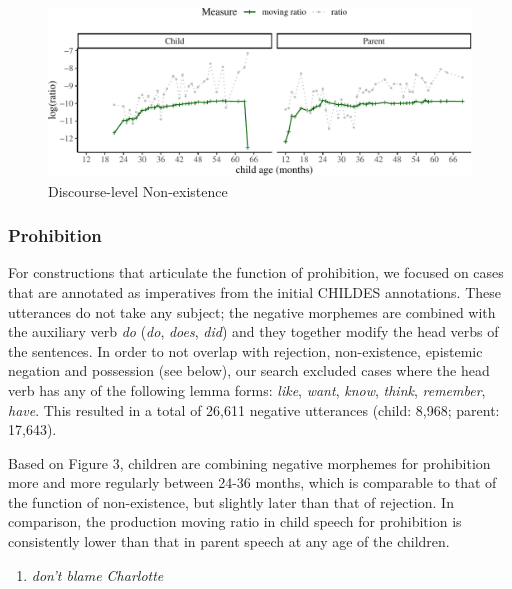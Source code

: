 \documentclass[
  english,
  man,floatsintext]{apa6}
\providecommand{\tightlist}{%
  \setlength{\itemsep}{0pt}\setlength{\parskip}{0pt}}
\begin{document}
\begin{figure}[H]

{\centering \includegraphics{neg_construction_article_files/figure-latex/existencediscourse-1} 

}

\caption{Discourse-level Non-existence}\label{fig:existencediscourse}
\end{figure}

\hypertarget{prohibition}{%
\subsubsection{Prohibition}\label{prohibition}}

For constructions that articulate the function of prohibition, we focused on cases that are annotated as imperatives from the initial CHILDES annotations. These utterances do not take any subject; the negative morphemes are combined with the auxiliary verb \emph{do} (\emph{do}, \emph{does}, \emph{did}) and they together modify the head verbs of the sentences.
In order to not overlap with rejection, non-existence, epistemic negation and possession (see below), our search excluded cases where the head verb has any of the following lemma forms: \emph{like}, \emph{want}, \emph{know}, \emph{think}, \emph{remember}, \emph{have}. This resulted in a total of 26,611 negative utterances (child: 8,968; parent: 17,643).

Based on Figure 3, children are combining negative morphemes for prohibition more and more regularly between 24-36 months, which is comparable to that of the function of non-existence, but slightly later than that of rejection. In comparison, the production moving ratio in child speech for prohibition is consistently lower than that in parent speech at any age of the children.

\begin{enumerate}
\def\labelenumi{(\arabic{enumi})}
\setcounter{enumi}{6}
\tightlist
\item
  \emph{don't blame Charlotte}
\end{enumerate}
\end{document}
